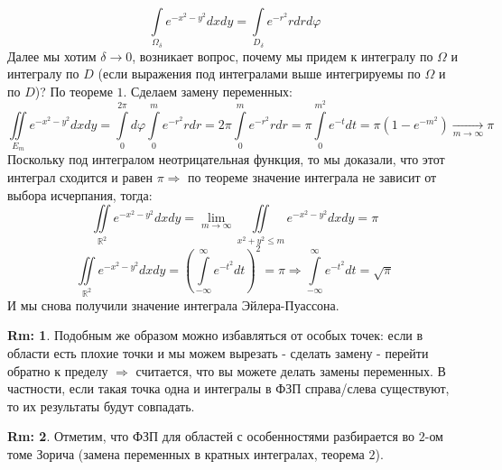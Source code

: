 \documentclass[12pt]{article}
\newcommand{\MR}{\mathbb{R}}
\theoremstyle{definition}
\newtheorem{rem}{Rm:}
\newcommand{\ddint}[2]{\displaystyle\int\limits_{#1}^{#2}}
\begin{document}
$$
	\ddint{\Omega_\delta}{}e^{-x^2 - y^2}dxdy = \ddint{D_\delta}{}e^{-r^2}rdrd\varphi 
$$
Далее мы хотим $\delta \to 0$, возникает вопрос, почему мы придем к интегралу по $\Omega$ и интегралу по $D$ (если выражения под интегралами выше интегрируемы по $\Omega$ и по $D$)? По теореме $1$. Сделаем замену переменных:
$$
	\iint\limits_{E_m}{}e^{-x^2 - y^2}dxdy = \ddint{0}{2\pi}d\varphi \ddint{0}{m}e^{-r^2}rdr = 2\pi\ddint{0}{m}e^{-r^2}rdr = \pi\ddint{0}{m^2}e^{-t}dt = \pi(1 - e^{-m^2}) \xrightarrow[m \to \infty]{} \pi
$$
Поскольку под интегралом неотрицательная функция, то мы доказали, что этот интеграл сходится и равен $\pi \Rightarrow$ по теореме значение интеграла не зависит от выбора исчерпания, тогда:
$$
	\iint\limits_{\MR^2}e^{-x^2 - y^2}dxdy = \lim\limits_{m \to \infty}\iint\limits_{x^2 + y^2 \leq m}e^{-x^2 - y^2}dxdy = \pi
$$
$$
	\iint\limits_{\MR^2}e^{-x^2 - y^2}dxdy = \left(\ddint{-\infty}{\infty}e^{-t^2}dt\right)^2 = \pi \Rightarrow \ddint{-\infty}{\infty}e^{-t^2}dt = \sqrt{\pi}
$$
И мы снова получили значение интеграла Эйлера-Пуассона.
\begin{rem}
	Подобным же образом можно избавляться от особых точек: если в области есть плохие точки и мы можем вырезать - сделать замену - перейти обратно к пределу $\Rightarrow$ считается, что вы можете делать замены переменных. В частности, если такая точка одна и интегралы в ФЗП справа/слева существуют, то их результаты будут совпадать.
\end{rem}
\begin{rem}
	Отметим, что ФЗП для областей с особенностями разбирается во $2$-ом томе Зорича (замена переменных в кратных интегралах, теорема $2$).
\end{rem}
\end{document}
